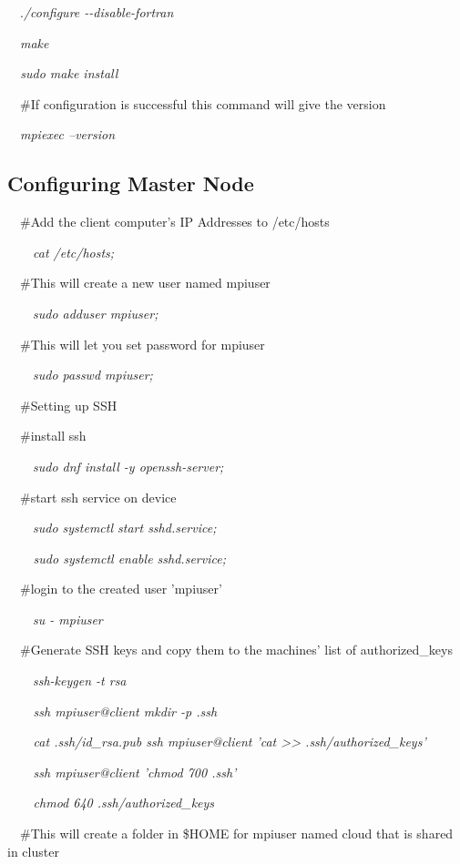 \documentclass[a4paper]{article}
\begin{document}
\ \ .\textit{/configure -{}-disable-fortran}

\ \ \textit{make}

{\itshape
\ \ sudo make install}

\ \ \#If configuration is successful this command will give the version

\ \ \textit{mpiexec --version}


\bigskip

\subsection[Configuring Master Node]{\textmd{Configuring Master Node}}
\ \ \#Add the client computer's IP Addresses to /etc/hosts

\ \ \ \ \textit{cat /etc/hosts;}

\ \ \#This will create a new user named mpiuser 

\ \ \ \ \textit{sudo adduser mpiuser;}

\ \ \#This will let you set password for mpiuser

\ \ \ \ \textit{sudo passwd mpiuser;}

\ \ \#Setting up SSH


\bigskip


\bigskip

\ \ \#install ssh

\ \ \ \ \textit{sudo dnf install -y openssh-server;}

\ \ \#start ssh service on device

\ \ \ \ \textit{sudo systemctl start sshd.service;}

{\itshape
\ \ \ \ sudo systemctl enable sshd.service;}

\ \ \#login to the created user 'mpiuser'

\ \ \ \ \textit{su - mpiuser}

\ \ \#Generate SSH keys and copy them to the machines' list of authorized\_keys

\ \ \ \ \textit{ssh-keygen -t rsa}

{\itshape
\ \ \ \ ssh mpiuser@client mkdir -p .ssh}

{\itshape
\ \ \ \ cat .ssh/id\_rsa.pub {\textbar} ssh mpiuser@client 'cat {\textgreater}{\textgreater} .ssh/authorized\_keys'}

{\itshape
\ \ \ \ ssh mpiuser@client 'chmod 700 .ssh'}

{\itshape
\ \ \ \ chmod 640 .ssh/authorized\_keys}

\ \ \#This will create a folder in \$HOME for mpiuser named cloud that is shared in cluster
\end{document}

